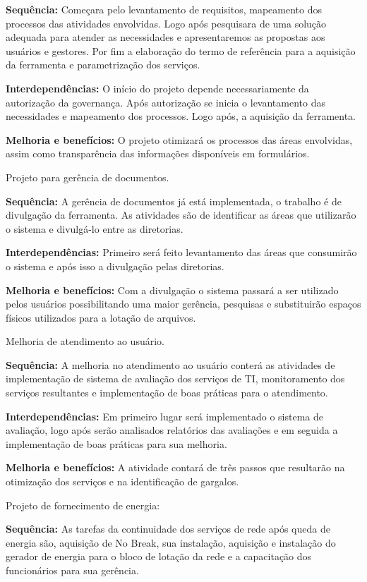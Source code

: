 \textbf{Sequência:} Começara pelo levantamento de requisitos, mapeamento dos processos das atividades envolvidas. Logo após pesquisara de uma solução adequada para atender as necessidades e apresentaremos as propostas aos usuários e gestores. Por fim a elaboração do termo de referência para a aquisição da ferramenta e parametrização dos serviços.

\textbf{Interdependências:} O início do projeto depende necessariamente da autorização da governança. Após autorização se inicia o levantamento das necessidades e mapeamento dos processos. Logo após, a aquisição da ferramenta.

\textbf{Melhoria e benefícios:} O projeto otimizará os processos das áreas envolvidas, assim como transparência das informações disponíveis em formulários.

Projeto para gerência de documentos.

\textbf{Sequência:} A gerência de documentos já está implementada, o trabalho é de divulgação da ferramenta. As atividades são de identificar as áreas que utilizarão o sistema e divulgá-lo entre as diretorias. 

\textbf{Interdependências:} Primeiro será feito levantamento das áreas que consumirão o sistema e após isso a divulgação pelas diretorias.

\textbf{Melhoria e benefícios:} Com a divulgação o sistema passará a ser utilizado pelos usuários possibilitando uma maior gerência, pesquisas e substituirão espaços físicos utilizados para a lotação de arquivos.

Melhoria de atendimento ao usuário.

\textbf{Sequência:} A melhoria no atendimento ao usuário conterá as atividades de implementação de sistema de avaliação dos serviços de TI, monitoramento dos serviços resultantes e implementação de boas práticas para o atendimento.

\textbf{Interdependências:} Em primeiro lugar será implementado o sistema de avaliação, logo após serão analisados relatórios das avaliações e em seguida a implementação de boas práticas para sua melhoria. 

\textbf{Melhoria e benefícios:} A atividade contará de três passos que resultarão na otimização dos serviços e na identificação de gargalos.

Projeto de fornecimento de energia:

\textbf{Sequência:} As tarefas da continuidade dos serviços de rede após queda de energia são, aquisição de No Break, sua instalação, aquisição e instalação do gerador de energia para o bloco de lotação da rede e a capacitação dos funcionários para sua gerência. 

